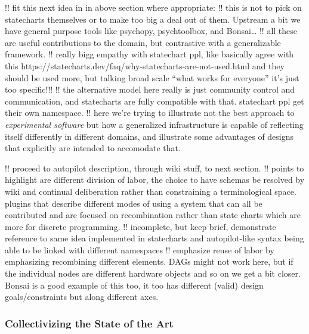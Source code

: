 \documentclass[10pt]{article}
\begin{document}
\begin{multicols}{2}
!! fit this next idea in in above section where appropriate: !! this is
not to pick on statecharts themselves or to make too big a deal out of
them. Upstream a bit we have general purpose tools like psychopy,
psychtoolbox, and Bonsai\ldots{} !! all these are useful contributions
to the domain, but contrastive with a generalizable framework. !! really
bigg empathy with statechart ppl, like basically agree with this
https://statecharts.dev/faq/why-statecharts-are-not-used.html and they
should be used more, but talking broad scale ``what works for everyone''
it's just too specific!!! !! the alternative model here really is just
community control and communication, and statecharts are fully
compatible with that. statechart ppl get their own namespace. !! here
we're trying to illustrate not the best approach to \emph{experimental
software} but how a generalized infrastructure is capable of reflecting
itself differently in different domains, and illustrate some advantages
of designs that explicitly are intended to accomodate that.

!! proceed to autopilot description, through wiki stuff, to next
section. !! points to highlight are different division of labor, the
choice to have schemas be resolved by wiki and continual deliberation
rather than constraining a terminological space. plugins that describe
different modes of using a system that can all be contributed and are
focused on recombination rather than state charts which are more for
discrete programming. !! incomplete, but keep brief, demonstrate
reference to same idea implemented in statecharts and autopilot-like
syntax being able to be linked with different namespaces !! emphasize
reuse of labor by emphasizing recombining different elements. DAGs might
not work here, but if the individual nodes are different hardware
objects and so on we get a bit closer. Bonsai is a good example of this
too, it too has different (valid) design goals/constraints but along
different axes.


\end{multicols}


\hypertarget{collectivizing-the-state-of-the-art}{%
\subsubsection{Collectivizing the State of the
Art}\label{collectivizing-the-state-of-the-art}}
\end{document}
